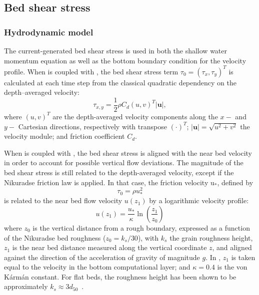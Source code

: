 \subsection{Bed shear stress}
\subsubsection{Hydrodynamic model}
The current-generated bed shear stress is used in both the shallow water momentum
equation as well as the bottom boundary condition for the velocity profile. 
When \sisyphe is coupled with \teldd, the bed shear stress term $\tau_{0}=(\tau_{x},\tau_{y})^T$
is calculated at each time step from the classical quadratic dependency on the depth--averaged velocity:
\begin{equation}\label{eq:Cd}
\tau_{x,y} =\frac{1}{2} \rho C_d (u,v)^T|\mathbf u|, 
\end{equation}
where $(u,v)^T$ are the depth-averaged
velocity components along the $x-$ and $y-$ Cartesian directions, respectively with transpose $(\cdot)^T$; $|\mathbf u| = \sqrt{{u}^2+{v}^2}$ the velocity module; and friction coefficient $C_d$.

When \sisyphe is coupled with \telddd, the bed shear stress is aligned
with the near bed velocity in order to account for possible vertical flow deviations. The magnitude of the bed shear stress is still related
to the depth-averaged velocity, except if the Nikuradse friction law is
applied. In that case, the friction velocity u$_{*}$, defined by
\begin{equation}\label{eq:us}
\tau _0 = \rho u_*^2 
\end{equation}
is related to the near bed flow velocity $u(z_1)$ by a logarithmic
velocity profile:
\begin{equation}\label{eq:velprof}
u(z_1) = \frac{u_*}{\kappa} \ln\left(\frac{z_1}{z_0}\right)  
\end{equation}
where $z_0$ is the vertical distance from a rough boundary, expressed as a function of the Nikuradse bed roughness ($z_0 = k_s/30$), with $k_s$ the grain roughness height, $z_1$ is the near bed distance measured along the vertical coordinate $z$, and aligned against the direction of the acceleration of gravity of magnitude $g$. In \telddd, $z_1$ is taken equal to the velocity in the bottom computational layer; and $\kappa = 0.4$ is the von K\'arm\'an constant. For flat beds, the roughness height has been shown to be approximately $k_s\approx 3 d_{50}$~\cite{JULIEN}.

